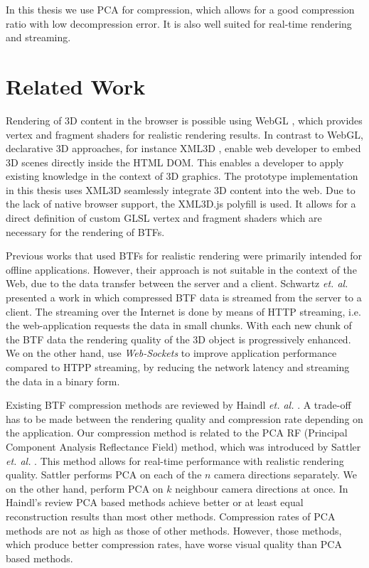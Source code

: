 In this thesis we use PCA for compression, which allows for a good compression ratio with low decompression error.
It is also well suited for real-time rendering and streaming.



\section{Related Work}
\label{section:related_work}
Rendering of 3D content in the browser is possible using WebGL \cite{webgl}, 
which provides vertex and fragment shaders for realistic rendering results.  
In contrast to WebGL, declarative 3D approaches, for instance XML3D \cite{xml3d}, enable web developer to embed 3D scenes  directly inside the HTML DOM. 
 This enables a developer to apply existing knowledge in the context of 3D graphics.  
The prototype implementation in this thesis  uses XML3D seamlessly  integrate 3D content into the web.
 Due to the lack of native browser support, the XML3D.js polyfill is used. 
 It allows for a direct definition of custom GLSL vertex and fragment shaders which are necessary for the rendering of BTFs.
 
Previous works that used BTFs for realistic rendering were primarily intended  for offline applications.
However, their approach is not suitable in the context of the Web, due to the data transfer between the server and a client.
  Schwartz \emph{et. al.} \cite{webglbtfstreaming} presented a work in which compressed BTF data is streamed from the server to a client.
 The streaming over the Internet is done by means of HTTP streaming, i.e. the web-application requests the data in small chunks.
 With each new chunk of the BTF data the rendering quality of the 3D object is progressively enhanced.
 We on the other hand, use \emph{Web-Sockets} to improve application performance compared to HTPP streaming, by reducing the network latency and streaming the data in a binary form.

 
Existing BTF compression methods are reviewed by Haindl \emph{et. al.} \cite{haindl, haindl_visual}.
A trade-off has to be made between the rendering quality and compression rate depending on the application.
 Our compression method is related to the PCA RF (Principal Component Analysis Reflectance Field) method, which was introduced by Sattler \emph{et. al.} \cite{star2004}.
This method allows for real-time performance with realistic rendering quality. 
Sattler performs PCA on each of the $n$ camera directions separately. We on the other hand, perform PCA on $k$ neighbour camera directions at once.
In Haindl's review \cite{haindl} PCA based methods achieve better or at least equal reconstruction results than most other methods.
Compression rates of PCA methods are not as high as those of other methods. However, those methods, which produce better compression rates, have worse visual quality than PCA based methods.






